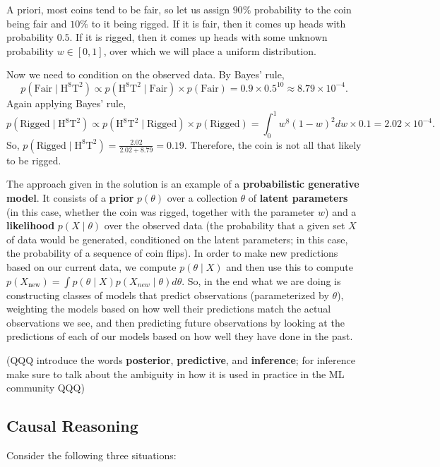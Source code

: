 \documentclass[11pt]{article}
\newenvironment{solution}[1][Solution]{\begin{trivlist}
\item[\hskip \labelsep {\bfseries #1}]}{\end{trivlist}}
\begin{document}
\begin{solution}
A priori, most coins tend to be fair, so let us assign $90\%$ probability to the coin being fair and $10\%$ to it being rigged. If it is fair, then it comes up heads with probability $0.5$. If it is rigged, then it comes up heads with some unknown probability $w \in [0,1]$, over which we will place a uniform distribution.

Now we need to condition on the observed data. By Bayes' rule, 
\[ p(\mathrm{Fair} \mid \mathrm{H^8T^2}) \propto p(\mathrm{H^8T^2} \mid \mathrm{Fair}) \times p(\mathrm{Fair}) = 0.9 \times 0.5^10 \approx 8.79 \times 10^{-4}. \]
Again applying Bayes' rule, 
\[ p(\mathrm{Rigged} \mid \mathrm{H^8T^2}) \propto p(\mathrm{H^8T^2} \mid \mathrm{Rigged}) \times p(\mathrm{Rigged}) = \int_{0}^{1} w^8(1-w)^2 dw \times 0.1 = 2.02 \times 10^{-4}. \]
So, $p(\mathrm{Rigged} \mid \mathrm{H^8T^2}) = \frac{2.02}{2.02+8.79} = 0.19$. Therefore, the coin is not all that likely to be rigged. 
\end{solution}

The approach given in the solution is an example of a \textbf{probabilistic generative model}. It consists of a \textbf{prior} $p(\theta)$ over a collection $\theta$ of \textbf{latent parameters} (in this case, whether the coin was rigged, together with the parameter $w$) and a \textbf{likelihood} $p(X \mid \theta)$ over the observed data (the probability that a given set $X$ of data would be generated, conditioned on the latent parameters; in this case, the probability of a sequence of coin flips). In order to make new predictions based on our current data, we compute $p(\theta \mid X)$ and then use this to compute $p(X_{\mathrm{new}}) = \int p(\theta \mid X) p(X_{new} \mid \theta) d\theta$. So, in the end what we are doing is constructing classes of models that predict observations (parameterized by $\theta$), weighting the models based on how well their predictions match the actual observations we see, and then predicting future observations by looking at the predictions of each of our models based on how well they have done in the past.

(QQQ introduce the words \textbf{posterior}, \textbf{predictive}, and \textbf{inference}; for inference make sure to talk about the ambiguity in how it is used in practice in the ML community QQQ)

\subsection{Causal Reasoning}
Consider the following three situations:
\end{document}
